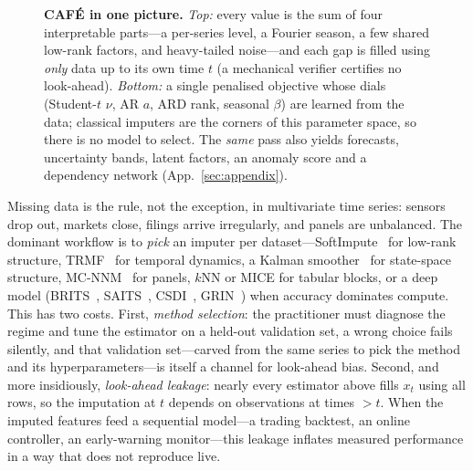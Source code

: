 \documentclass[10pt,twocolumn]{article}
\begin{document}
\begin{figure}[t]
\caption{\textbf{CAF\'E in one picture.} \emph{Top:} every value is the sum of four
interpretable parts---a per-series level, a Fourier season, a few shared low-rank
factors, and heavy-tailed noise---and each gap is filled using \emph{only} data up to
its own time $t$ (a mechanical verifier certifies no look-ahead). \emph{Bottom:} a
single penalised objective whose dials (Student-$t$ $\nu$, AR $a$, ARD rank, seasonal
$\beta$) are learned from the data; classical imputers are the corners of this
parameter space, so there is no model to select. The \emph{same} pass also yields
forecasts, uncertainty bands, latent factors, an anomaly score and a dependency
network (App.~\ref{sec:appendix}).}
\label{fig:hero}
\end{figure}

Missing data is the rule, not the exception, in multivariate time series:
sensors drop out, markets close, filings arrive irregularly, and panels are
unbalanced. The dominant workflow is to \emph{pick} an imputer per
dataset---SoftImpute~\cite{mazumder2010} for low-rank structure, TRMF~\cite{yu2016}
for temporal dynamics, a Kalman smoother~\cite{harvey1989} for state-space
structure, MC-NNM~\cite{athey2021} for panels, $k$NN or MICE for tabular blocks,
or a deep model (BRITS~\cite{cao2018}, SAITS~\cite{du2023}, CSDI~\cite{tashiro2021},
GRIN~\cite{cini2022}) when accuracy dominates compute. This has two costs. First,
\emph{method selection}: the practitioner must diagnose the regime and tune the
estimator on a held-out validation set, a wrong choice fails silently, and that
validation set---carved from the same series to pick the method and its
hyperparameters---is itself a channel for look-ahead bias. Second, and more
insidiously,
\emph{look-ahead leakage}: nearly every estimator above fills $x_t$ using all
rows, so the imputation at $t$ depends on observations at times $>t$. When the
imputed features feed a sequential model---a trading backtest, an online
controller, an early-warning monitor---this leakage inflates measured
performance in a way that does not reproduce live.
\end{document}
